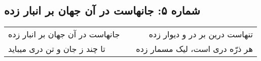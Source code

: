 \begin{center}
\section*{شماره ۵: جانهاست در آن جهان بر انبار زده}
\label{sec:005}
\begin{longtable}{l p{0.5cm} r}
جانهاست در آن جهان بر انبار زده
&&
تنهاست درین بر در و دیوار زده
\\
تا چند ز جان و تن دری میباید
&&
هر ذرّه دری است، لیک مسمار زده
\\
\end{longtable}
\end{center}
